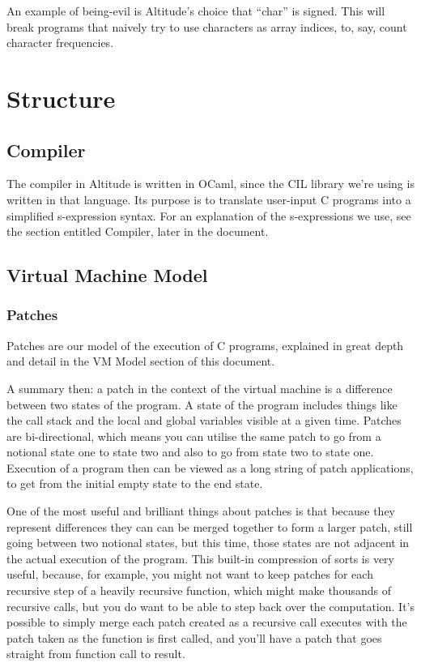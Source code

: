 \documentclass[a4paper]{report}
\begin{document}
An example of being-evil is Altitude's choice that ``char'' is signed. This will break programs that naively try to use characters as array indices, to, say, count character frequencies.


\section{Structure}
\subsection{Compiler}
The compiler in Altitude is written in OCaml, since the CIL library we're using is written in that language. Its purpose is to translate user-input C programs into a simplified s-expression syntax. For an explanation of the s-expressions we use, see the section entitled Compiler, later in the document.
\subsection{Virtual Machine Model}

\subsubsection{Patches}
Patches are our model of the execution of C programs, explained in great depth and detail in the VM Model section of this document. 

A summary then: a patch in the context of the virtual machine is a difference between two states of the program. A state of the program includes things like the call stack and the local and global variables visible at a given time. Patches are bi-directional, which means you can utilise the same patch to go from a notional state one to state two and also to go from state two to state one. Execution of a program then can be viewed as a long string of patch applications, to get from the initial empty state to the end state. 

One of the most useful and brilliant things about patches is that because they represent differences they can can be merged together to form a larger patch, still going between two notional states, but this time, those states are not adjacent in the actual execution of the program. This built-in compression of sorts is very useful, because, for example, you might not want to keep patches for each recursive step of a heavily recursive function, which might make thousands of recursive calls, but you do want to be able to step back over the computation. It's possible to simply merge each patch created as a recursive call executes with the patch taken as the function is first called, and you'll have a patch that goes straight from function call to result.
\end{document}
